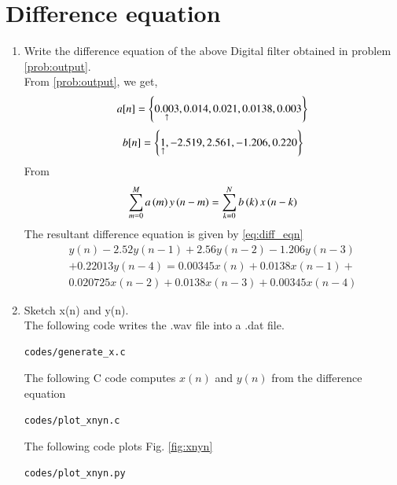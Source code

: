 \documentclass[journal,12pt,twocolumn]{IEEEtran}
\renewcommand\thesection{\arabic{section}}
\begin{document}
\section{Difference equation}
\begin{enumerate}[label=\thesection.\arabic*,ref=\thesection.\theenumi]
\item
\label{prob:diff_eq}
Write the difference equation of the above Digital filter obtained in problem \ref{prob:output}.
\\
\solution
From \ref{prob:output}, we get,
\begin{equation}
\label{eq:an}
a[n] = \left\{\underset{\uparrow}{0.003},0.014,0.021 , 0.0138 ,0.003\right\}
\end{equation}
\begin{equation}
\label{eq:bn}
b[n] = \left\{\underset{\uparrow}{1},-2.519,2.561,-1.206,0.220\right\}
\end{equation}
From 
\begin{align}
\label{eq:iir_filter_gen}
 \sum _{m=0}^{M}a\left(m\right)y\left(n-m\right)=\sum _{k=0}^{N}b\left(k\right)x\left(n-k\right)
\end{align}
The resultant difference equation is given by \eqref{eq:diff_eqn}
\begin{align}
\label{eq:diff_eqn}
y(n) - 2.52y(n-1) + 2.56y(n-2) - 1.206y(n-3)
\nonumber\\
+ 0.22013y(n-4) = 0.00345x(n) + 0.0138x(n-1) +
\nonumber\\
 0.020725x(n-2) + 0.0138x(n-3) + 0.00345x(n-4)
\end{align}
\item
\label{prob:xnyn_plot1}
Sketch x(n) and y(n).
\\
\solution
The following code writes the .wav file into a .dat file.
\begin{lstlisting}
codes/generate_x.c
\end{lstlisting}
The following C code computes $x(n)$ and $y(n)$ from the difference equation
\begin{lstlisting}
codes/plot_xnyn.c
\end{lstlisting}
The following code plots Fig. \ref{fig:xnyn}
\begin{lstlisting}
codes/plot_xnyn.py
\end{lstlisting}
\begin{figure}[!ht]
\begin{center}

\end{center}
\end{figure}
\end{enumerate}
\end{document}
